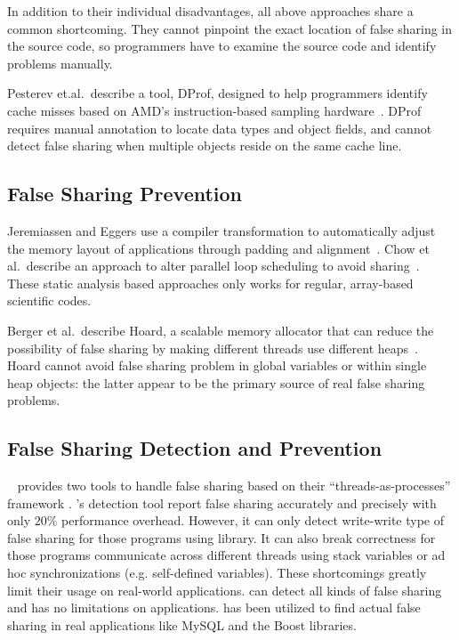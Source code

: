 In addition to their individual disadvantages,
all above approaches share a common shortcoming. 
They cannot pinpoint the exact location of false sharing in the source code, so programmers have to examine the source code and identify problems manually.

Pesterev et.al.\ describe a tool, DProf, designed to help programmers identify cache misses based on
AMD's instruction-based sampling hardware~\cite{DProf}.
DProf requires manual annotation to locate data types and object fields, and cannot detect false
sharing when multiple objects reside on the same cache line.

\subsection{False Sharing Prevention}
Jeremiassen and Eggers use a compiler transformation to automatically adjust the
memory layout of applications through padding and alignment~\cite{falseshare:compile}.
Chow et al.\ describe an approach to alter parallel loop scheduling to avoid
sharing~\cite{falseshare:schedule}.
These static analysis based approaches only works for regular,
array-based scientific codes.

Berger et al.\ describe Hoard, a scalable memory allocator that can
reduce the possibility of false sharing by making different threads
use different heaps~\cite{Hoard}. Hoard 
cannot avoid false sharing problem in global variables or within
single heap objects: the latter appear to be the primary source of
real false sharing problems.

\subsection{False Sharing Detection and Prevention}
\sheriff{}~\cite{sheriff} provides two tools to handle false sharing based on 
their ``threads-as-processes'' framework .
\Sheriff{}'s detection tool 
report false sharing accurately and precisely with only $20\%$ performance overhead.
However, it can only detect write-write type of false sharing for those programs 
using \pthreads{} library. It can also break correctness for those programs communicate across different threads using stack variables or ad hoc synchronizations (e.g. self-defined variables).
These shortcomings greatly limit their usage on real-world applications.  
\Predator{} can detect all kinds of false sharing and has no limitations on applications. \Predator{} has been utilized to find actual false sharing in real applications like MySQL and the Boost libraries.

